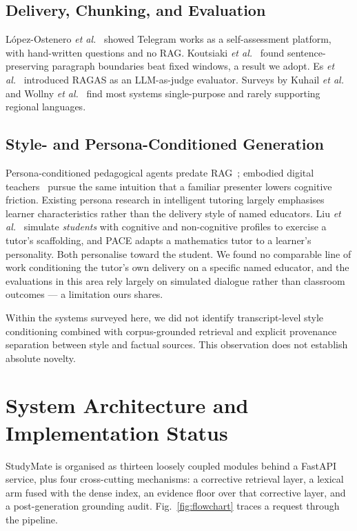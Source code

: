 \documentclass[conference]{IEEEtran}
\begin{document}
\subsection{Delivery, Chunking, and Evaluation}
L\'opez-Ostenero \textit{et al.}~\cite{gielis2025} showed Telegram works as a
self-assessment platform, with hand-written questions and no RAG.
Koutsiaki \textit{et al.}~\cite{koutsiaki2025} found sentence-preserving
paragraph boundaries beat fixed windows, a result we adopt.
Es \textit{et al.}~\cite{es2025} introduced RAGAS as an LLM-as-judge evaluator.
Surveys by Kuhail \textit{et al.}~\cite{kuhail2023} and
Wollny \textit{et al.}~\cite{wollny2021} find most systems single-purpose and
rarely supporting regional languages.

\subsection{Style- and Persona-Conditioned Generation}
Persona-conditioned pedagogical agents predate RAG~\cite{liu2024persona,liu2025pace};
embodied digital teachers~\cite{zhao2024} pursue the same intuition that a
familiar presenter lowers cognitive friction.
Existing persona research in intelligent tutoring largely emphasises
learner characteristics rather than the delivery style of named educators. Liu
\textit{et al.}~\cite{liu2024persona} simulate \emph{students} with cognitive
and non-cognitive profiles to exercise a tutor's scaffolding, and PACE
\cite{liu2025pace} adapts a mathematics tutor to a learner's personality.
Both personalise toward the student. We found no comparable line of work
conditioning the tutor's own delivery on a specific named educator, and the
evaluations in this area rely largely on simulated dialogue rather than
classroom outcomes --- a limitation ours shares.

Within the systems surveyed here, we did not identify transcript-level
style conditioning combined with corpus-grounded retrieval and explicit
provenance separation between style and factual sources. This observation
does not establish absolute novelty.

\section{System Architecture and Implementation Status}
StudyMate is organised as thirteen loosely coupled modules behind a FastAPI
service, plus four cross-cutting mechanisms: a corrective retrieval layer, a
lexical arm fused with the dense index, an evidence floor over that corrective
layer, and a post-generation grounding audit.
Fig.~\ref{fig:flowchart} traces a request through the pipeline.
\end{document}
